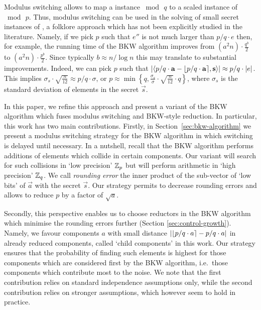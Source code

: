 Modulus switching allows to map a \LWE{} instance $\bmod \, q$ to a scaled instance of \LWE{} $\bmod \, p$.
Thus, modulus switching can be used in the solving of small secret instances of \LWE, a folklore approach which has not been explicitly studied in the literature. Namely, if we pick $p$ such that $e''$ is not much larger than $p/q \cdot e$ then, for example, the running time of the BKW 
algorithm improves from $(a^2n)\cdot \frac{q^b}{2}$ to $(a^2n)\cdot \frac{p^b}{2}$. Since typically $b \approx n/\log n$ 
this may translate to substantial improvements. Indeed, we can pick $p$ such that $\abs{\dotp{{p}/{q} \cdot \vec{a} - 
\round{ {p}/{q} \cdot \vec{a} }}{\vec{s}}} \approx p/q \cdot \abs{e}$.
This implies ${\sigma_s}\cdot \sqrt{\frac{n}{12}} \approx p/q \cdot \sigma$, or
$
p \approx \min\left\{q, \frac{\sigma_s}{\sigma}\cdot \sqrt{\frac{n}{12}} \cdot q \right\}$, where $\sigma_s$ is the standard deviation of elements in the secret $\vec{s}$.

In this paper, we refine this approach and present a variant of the BKW algorithm which fuses modulus switching and BKW-style reduction. In particular, this work has two main contributions. Firstly, in Section~\ref{sec:bkw-algorithm} we present a modulus switching strategy for the BKW algorithm in which switching is delayed until necessary.  In a nutshell, recall that the BKW algorithm performs additions of elements which collide in certain components. Our variant will search for such collisions in `low precision' $\mathbb{Z}_p$ but will perform arithmetic in `high precision' $\mathbb{Z}_q$.  We call {\it rounding error} the inner product of the sub-vector of `low bits' of $\vec{a}$ with the secret $\vec{s}$. Our strategy permits to decrease rounding errors and allows to reduce $p$ by a factor of $\sqrt{a}$.

Secondly, this perspective enables us to choose reductors in the BKW algorithm which minimise the rounding errors further (Section \ref{sec:control-growth}). Namely, we favour components $a$ with small distance $\left|\left\lfloor{ {p}/{q} \cdot a}\right\rceil - {p}/{q} \cdot a\right|$ in already reduced components, called `child components' in this work. Our strategy ensures that the probability of finding such elements is highest for those components which are considered first by the BKW algorithm, i.e.\ those components which contribute most to the noise. We note that the first contribution relies on standard independence assumptions only, while the second contribution relies on stronger assumptions, which however seem to hold  in practice.

